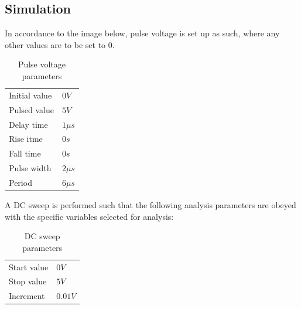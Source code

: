 \documentclass[12pt]{article}
\begin{document}
\subsection{Simulation}
In accordance to the image below, pulse voltage is set up as such, where any other values are to be set to 0.
\begin{table}[h]
\centering
\begin{tabular}{ll}
Initial value & $0V$ \\
Pulsed value & $5V$ \\
Delay time & $1 \mu s$ \\
Rise itme & $0 s$ \\
Fall time & $0 s$ \\
Pulse width & $2 \mu s$ \\
Period & $6 \mu s$
\end{tabular}
\caption{Pulse voltage parameters}
\end{table}
A DC sweep is performed such that the following analysis parameters are obeyed with the specific variables selected for analysis:
\begin{table}[h]
\centering
\begin{tabular}{ll}
Start value & $0V$ \\
Stop value & $5V$ \\
Increment & $0.01V$
\end{tabular}
\caption{DC sweep parameters}
\end{table}
\end{document}
